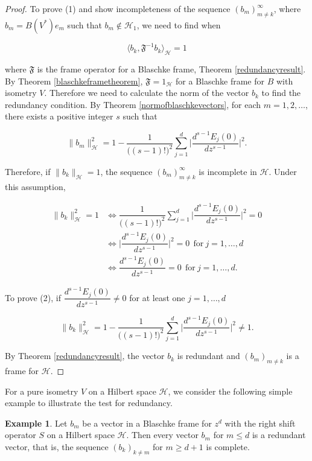 \documentclass[10pt, reqno]{amsart}
\theoremstyle{definition}
\newtheorem{example}[theorem]{Example}
\numberwithin{equation}{section}
\begin{document}
\begin{proof}
To prove (1) and show incompleteness of the sequence $(b_{m})_{m\neq k}^{\infty}$, where $b_{m} = B(V^{*})e_{m}$ such that $b_{m}\not\in\mathcal{H}_{1}$, we need to find when

$$\langle b_{k} , \mathfrak{F}^{-1} b_{k} \rangle_{\mathcal{H}} =1 $$

\noindent where $\mathfrak{F}$ is the frame operator for a Blaschke frame, Theorem \ref{redundancyresult}. By Theorem \ref{blaschkeframetheorem}, $\mathfrak{F}=1_{\mathcal{H}}$ for a Blaschke frame for $B$ with isometry $V$. Therefore we need to calculate the norm of the vector $b_{k}$ to find the redundancy condition. By Theorem \ref{normofblaschkevectors}, for each $m=1,2,\hdots$, there exists a positive integer $s$ such that

$$\|b_{m}\|_{\mathcal{H}}^{2} = 1 - \dfrac{1}{\big((s-1)!\big)^{2}}\sum_{j=1}^{d}\Bigg\lvert\dfrac{d^{s-1}E_{j}(0)}{dz^{s-1}}\Bigg\rvert^{2}.$$

\noindent Therefore, if $\|b_{k}\|_{\mathcal{H}}=1$, the sequence $(b_{m})_{m\neq k}^{\infty}$ is incomplete in $\mathcal{H}$. Under this assumption,

\begin{align*}
    \|b_{k}\|^{2}_{\mathcal{H}}=1 &\iff \dfrac{1}{\big((s-1)!\big)^{2}}\sum_{j=1}^{d}\Bigg\lvert\dfrac{d^{s-1}E_{j}(0)}{dz^{s-1}}\Bigg\rvert^{2}=0\\
    &\iff \Bigg\lvert\dfrac{d^{s-1}E_{j}(0)}{dz^{s-1}}\Bigg\rvert^{2} = 0~~\text{for}~j=1,\hdots,d\\
    &\iff \dfrac{d^{s-1}E_{j}(0)}{dz^{s-1}}=0~~\text{for}~j=1,\hdots,d.
\end{align*}

To prove (2), if $\dfrac{d^{s-1}E_{j}(0)}{dz^{s-1}}\neq 0$ for at least one $j=1,\hdots,d$

$$\|b_{k}\|_{\mathcal{H}}^{2} = 1 - \dfrac{1}{\big((s-1)!\big)^{2}}\sum_{j=1}^{d}\Bigg\lvert\dfrac{d^{s-1}E_{j}(0)}{dz^{s-1}}\Bigg\rvert^{2}\neq 1.$$

\noindent By Theorem \ref{redundancyresult}, the vector $b_{k}$ is redundant and $(b_{m})_{m\neq k}$ is a frame for $\mathcal{H}$.\end{proof}


For a pure isometry $V$ on a Hilbert space $\mathcal{H}$, we consider the following simple example to illustrate the test for redundancy.

\begin{example}\label{simpleexample}
Let $b_{m}$ be a vector in a Blaschke frame for $z^{d}$ with the right shift operator $S$ on a Hilbert space $\mathcal{H}$. Then every vector $b_{m}$ for $m\leq d$ is a redundant vector, that is, the sequence $(b_{k})_{k\neq m}$ for $m\geq d+1$ is complete.
    
\end{example}
\end{document}
